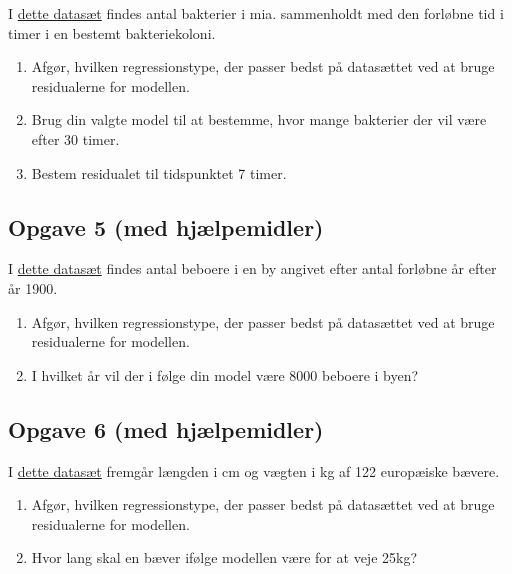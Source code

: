 \documentclass[12pt]{article}
\begin{document}
I \href{https://github.com/ChristianJLex/TeachingNotes/raw/master/2023-2024/Data%20og%20lign/bakterierResidual.xlsx}{\color{blue!60} dette datasæt} findes antal bakterier i mia. sammenholdt med den forløbne tid i timer i en bestemt bakteriekoloni. 

\begin{enumerate}[label=\roman*)]
	\item Afgør, hvilken regressionstype, der passer bedst på datasættet ved at bruge 
	residualerne for modellen.
	\item Brug din valgte model til at bestemme, hvor mange bakterier der vil være efter 30 
	timer.
	\item Bestem residualet til tidspunktet 7 timer. 
\end{enumerate}

\subsection*{Opgave 5 (med hjælpemidler)}

I \href{https://github.com/ChristianJLex/TeachingNotes/raw/master/2023-2024/Data%20og%20lign/beboereResidual.xlsx}{\color{blue!60} dette datasæt} findes antal beboere i en by angivet efter antal forløbne år efter år 1900.

\begin{enumerate}[label=\roman*)]
	\item Afgør, hvilken regressionstype, der passer bedst på datasættet ved at bruge 
	residualerne for modellen.
	\item I hvilket år vil der i følge din model være 8000 beboere i byen?
\end{enumerate}

\subsection*{Opgave 6 (med hjælpemidler)}

I \href{https://github.com/ChristianJLex/TeachingNotes/raw/master/2023-2024/Data og lign/Baevervaegt.xlsx}{\color{blue!60} dette datasæt} fremgår længden i cm og vægten i kg af 122 europæiske bævere. 

\begin{enumerate}[label=\roman*)]
	\item Afgør, hvilken regressionstype, der passer bedst på datasættet ved at bruge 
	residualerne for modellen.
	\item Hvor lang skal en bæver ifølge modellen være for at veje 25kg?
\end{enumerate}
\end{document}
